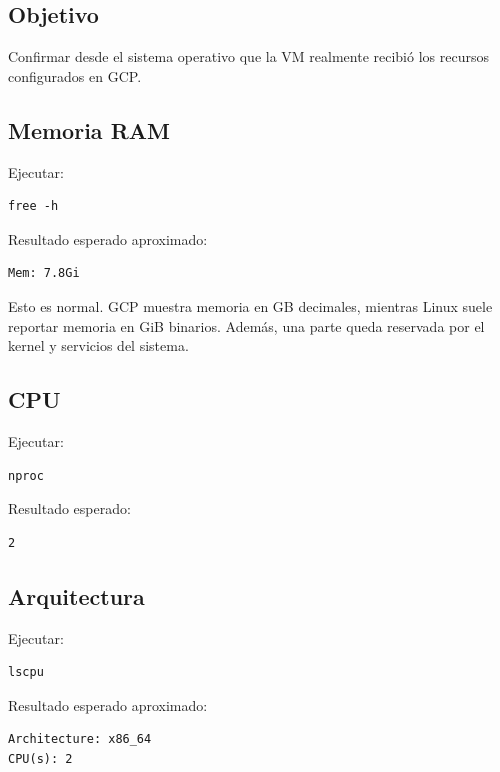 \documentclass[
  coursetitle={Cómputo Nube y Tecnologías Emergentes},
  coursehours={96},
  coursedate={Verano 2026},
  doctype={Práctica},
  otherlangs={english,french},
  authorname={Lázaro},
  authorsurname={Bustio-Martínez},
  authortitle={PhD},
  role={Profesor Investigador},
  email={lbustio@inaoe.mx},
  phone={5559504000},
  ext={7459},
  institution={Instituto Nacional de Astrofísica, Óptica y Electrónica (INAOE)},
  department={Maestría en Ciencias en Tecnologías de Seguridad},
  address={Luis Enrique Erro 1, Sta. Ma. Tonantzintla, San Andrés Cholula, CP 72840, Puebla, México},
  margin={0.5in}
]{../../lbustio_lecture_notes}
\begin{document}
\subsection{Objetivo}

Confirmar desde el sistema operativo que la VM realmente recibió los recursos configurados en GCP.

\subsection{Memoria RAM}

Ejecutar:

\begin{lstlisting}
free -h
\end{lstlisting}

Resultado esperado aproximado:

\begin{verbatim}
Mem: 7.8Gi
\end{verbatim}

Esto es normal. GCP muestra memoria en GB decimales, mientras Linux suele reportar memoria en GiB binarios. Además, una parte queda reservada por el kernel y servicios del sistema.

\subsection{CPU}

Ejecutar:

\begin{lstlisting}
nproc
\end{lstlisting}

Resultado esperado:

\begin{verbatim}
2
\end{verbatim}

\subsection{Arquitectura}

Ejecutar:

\begin{lstlisting}
lscpu
\end{lstlisting}

Resultado esperado aproximado:

\begin{verbatim}
Architecture: x86_64
CPU(s): 2
\end{verbatim}
\end{document}
